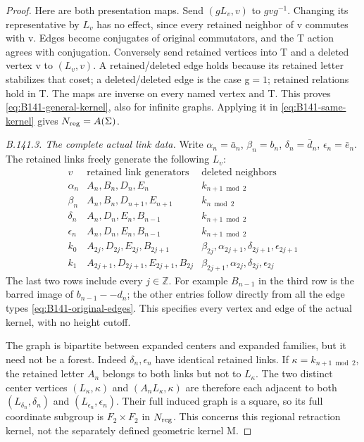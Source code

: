 \begin{proof}
Here are both presentation maps. Send $(gL_v,v)$ to $gvg^{-1}$.
Changing its representative by $L_v$ has no effect, since every
retained neighbor of v commutes with v. Edges become conjugates
of original commutators, and the T action agrees with conjugation.
Conversely send retained vertices into T and a deleted vertex v
to $(L_v,v)$. A retained/deleted edge holds because its retained
letter stabilizes that coset; a deleted/deleted edge is the case
g$=1$; retained relations hold in T. The maps are inverse on every
named vertex and T. This proves \eqref{eq:B141-general-kernel},
also for infinite graphs. Applying it in
\eqref{eq:B141-same-kernel} gives $N_{\rm reg}=A(\Sigma)$.

\emph{B.141.3. The complete actual link data.}
Write
$\alpha_n=\bar a_n$, $\beta_n=b_n$,
$\delta_n=\bar d_n$, $\epsilon_n=\bar e_n$.
The retained links freely generate the following $L_v$:
\begin{equation}\label{eq:B141-links}
\begin{array}{c|l|l}
v&\text{retained link generators}&\text{deleted neighbors}\\\hline
\alpha_n&A_n,B_n,D_n,E_n&k_{n+1\bmod2}\\
\beta_n&A_n,B_n,D_{n+1},E_{n+1}&k_{n\bmod2}\\
\delta_n&A_n,D_n,E_n,B_{n-1}&k_{n+1\bmod2}\\
\epsilon_n&A_n,D_n,E_n,B_{n-1}&k_{n+1\bmod2}\\
k_0&A_{2j},D_{2j},E_{2j},B_{2j+1}&
 \beta_{2j},\alpha_{2j+1},\delta_{2j+1},\epsilon_{2j+1}\\
k_1&A_{2j+1},D_{2j+1},E_{2j+1},B_{2j}&
 \beta_{2j+1},\alpha_{2j},\delta_{2j},\epsilon_{2j}
\end{array}
\end{equation}
The last two rows include every $j\in\mathbb Z$.
For example $B_{n-1}$ in the third row is the barred image of
$b_{n-1}--d_n$; the other entries follow directly from all the
edge types \eqref{eq:B141-original-edges}. This specifies every
vertex and edge of the actual kernel, with no height cutoff.

The graph is bipartite between expanded centers and expanded families,
but it need not be a forest. Indeed $\delta_n,\epsilon_n$ have
identical retained links. If $\kappa=k_{n+1\bmod2}$, the retained
letter $A_n$ belongs to both links but not to $L_\kappa$.
The two distinct center vertices $(L_\kappa,\kappa)$ and
$(A_nL_\kappa,\kappa)$ are therefore each adjacent to both
$(L_{\delta_n},\delta_n)$ and $(L_{\epsilon_n},\epsilon_n)$.
Their full induced graph is a square, so its full coordinate
subgroup is $F_2\times F_2$ in $N_{\rm reg}$.
This concerns this regional retraction kernel, not the separately
defined geometric kernel M.


\end{proof}
